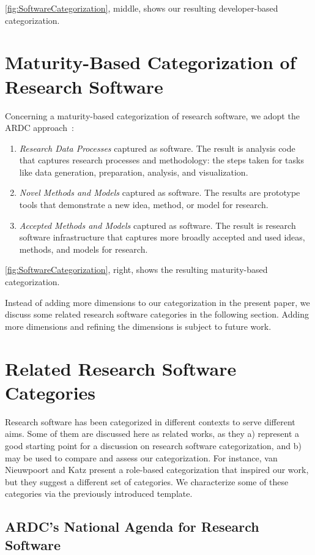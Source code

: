 \documentclass{IEEEcsmag}
\begin{document}
\autoref{fig:SoftwareCategorization}, middle, shows our resulting developer-based categorization.

\section{Maturity-Based Categorization of Research Software}

Concerning a maturity-based categorization of research software, we adopt the ARDC approach~\cite{ARDC2022}:
\begin{enumerate}
	\item \emph{Research Data Processes} captured as software. The result is analysis code that captures research processes and methodology: the steps taken for tasks like data generation, preparation, analysis, and visualization.
	\item \emph{Novel Methods and Models} captured as software. The results are prototype tools that demonstrate a new idea, method, or model for research.
	\item \emph{Accepted Methods and Models} captured as software. The result is research software infrastructure that captures more broadly accepted and used ideas, methods, and models for research.
\end{enumerate}
\autoref{fig:SoftwareCategorization}, right, shows the resulting maturity-based categorization.

Instead of adding more dimensions to our categorization in the present paper, we discuss some related research software categories in the following section. Adding more dimensions and refining the dimensions is subject to future work.

\section{Related Research Software Categories}

Research software has been categorized in different contexts to serve different aims.
Some of them are discussed here as related works, as they 
a) represent a good starting point for a discussion on research software categorization, and
b) may be used to compare and assess our categorization.
For instance, van Nieuwpoort and Katz \cite{NieuwpoortKatz2023} present a role-based categorization that inspired our work, but they suggest a different set of categories. 
We characterize some of these categories via the previously introduced template.

\subsection{ARDC's National Agenda for Research Software}
\end{document}
